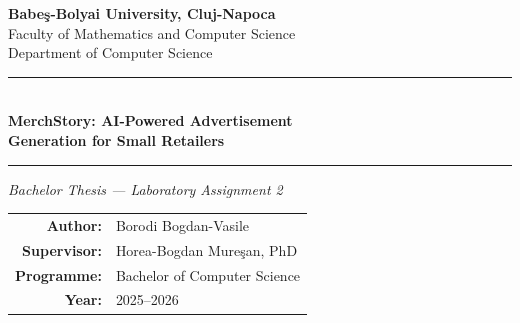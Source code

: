 \documentclass[12pt, a4paper]{report}
\begin{document}
\begin{titlepage}
  \centering
  \vspace*{1.5cm}

  {\large \textbf{Babe\c{s}-Bolyai University, Cluj-Napoca}}\\[0.3cm]
  {\large Faculty of Mathematics and Computer Science}\\[0.3cm]
  {\large Department of Computer Science}

  \vspace{2cm}

  \rule{\linewidth}{0.5pt}\\[0.4cm]
  {\LARGE \bfseries MerchStory: AI-Powered Advertisement\\[0.3cm]
  Generation for Small Retailers}\\[0.4cm]
  \rule{\linewidth}{0.5pt}

  \vspace{1.5cm}

  {\large \textit{Bachelor Thesis --- Laboratory Assignment 2}}

  \vspace{2cm}

  \begin{tabular}{rl}
    \textbf{Author:}      & Borodi Bogdan-Vasile \\[0.2cm]
    \textbf{Supervisor:}  & Horea-Bogdan Mure\c{s}an, PhD \\[0.2cm]
    \textbf{Programme:}   & Bachelor of Computer Science \\[0.2cm]
    \textbf{Year:}        & 2025--2026 \\
  \end{tabular}

  \vfill
\end{titlepage}
\end{document}
